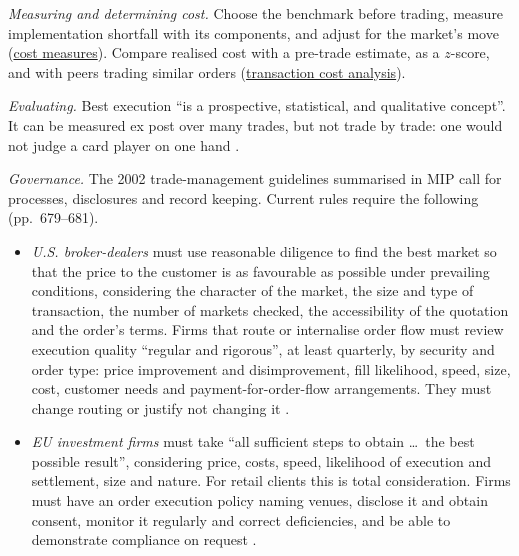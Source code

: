 \begin{qfmethod}\label{meth:trade-execution-evaluation-governance}
 \emph{Measuring and determining cost.} Choose the benchmark before trading, measure implementation shortfall with its components, and adjust for the market's move (\hyperref[meth:execution-cost-measures]{cost measures}). Compare realised cost with a pre-trade estimate, as a $z$-score, and with peers trading similar orders (\hyperref[meth:transaction-cost-analysis]{transaction cost analysis}).

\emph{Evaluating.} Best execution ``is a prospective, statistical, and qualitative concept''. It can be measured ex post over many trades, but not trade by trade: one would not judge a card player on one hand \citep[chap.~10, sec.~6.1, pp.~679--680]{managing-investment-portfolios-2007}.

\emph{Governance.} The 2002 trade-management guidelines summarised in MIP call for processes, disclosures and record keeping. Current rules require the following (pp.~679--681).
\begin{itemize}
\item \emph{U.S. broker-dealers} must use reasonable diligence to find the best market so that the price to the customer is as favourable as possible under prevailing conditions, considering the character of the market, the size and type of transaction, the number of markets checked, the accessibility of the quotation and the order's terms. Firms that route or internalise order flow must review execution quality ``regular and rigorous'', at least quarterly, by security and order type: price improvement and disimprovement, fill likelihood, speed, size, cost, customer needs and payment-for-order-flow arrangements. They must change routing or justify not changing it \citep[Rule~5310(a)(1) and Supplementary Material~.09]{finra-rule-5310}.
\item \emph{EU investment firms} must take ``all sufficient steps to obtain \dots\ the best possible result'', considering price, costs, speed, likelihood of execution and settlement, size and nature. For retail clients this is total consideration. Firms must have an order execution policy naming venues, disclose it and obtain consent, monitor it regularly and correct deficiencies, and be able to demonstrate compliance on request \citep[art.~27(1), (4)--(5), (7)--(8)]{eu-2014-65-mifid2}.
\end{itemize}


\end{qfmethod}
